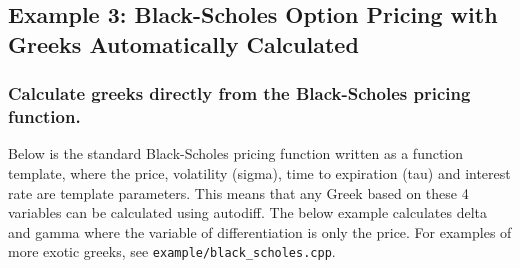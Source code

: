 \documentclass{article}
\begin{document}
\subsection{Example 3: Black-Scholes Option Pricing with Greeks Automatically Calculated}
\subsubsection{Calculate greeks directly from the Black-Scholes pricing function.}

Below is the standard Black-Scholes pricing function written as a function template, where the price, volatility
(sigma), time to expiration (tau) and interest rate are template parameters. This means that any Greek based on
these 4 variables can be calculated using autodiff. The below example calculates delta and gamma where the variable
of differentiation is only the price. For examples of more exotic greeks, see {\tt example/black\_scholes.cpp}.
\end{document}
